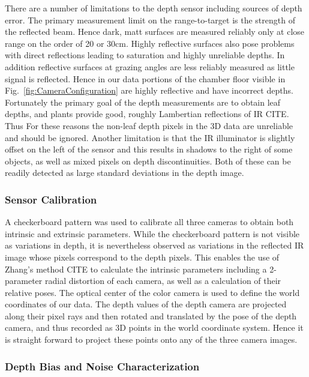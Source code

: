 There are a number of limitations to the depth sensor including sources of depth error.  The primary measurement limit on the range-to-target is the strength of the reflected beam. Hence dark, matt surfaces are measured reliably only at close range on the order of 20 or 30cm.  Highly reflective surfaces also pose problems with direct reflections leading to saturation and highly unreliable depths.  In addition reflective surfaces at grazing angles are less reliably measured as little signal is reflected.  Hence in our data portions of the chamber floor visible in Fig.~\ref{fig:CameraConfiguration} are highly reflective and have incorrect depths.  Fortunately the primary goal of the depth measurements are to obtain leaf depths, and plants provide good, roughly Lambertian reflections of IR CITE{}.  Thus For these reasons the non-leaf depth pixels in the 3D data are unreliable and should be ignored.  Another limitation is that the IR illuminator is slightly offset on the left of the sensor and this results in shadows to the right of some objects, as well as mixed pixels on depth discontinuities.  Both of these can be readily detected as large standard deviations in the depth image.

\subsubsection{Sensor Calibration}

A checkerboard pattern was used to calibrate all three cameras to obtain both intrinsic and extrinsic parameters.  While the checkerboard pattern is not visible as variations in depth, it is nevertheless observed as variations in the reflected IR image whose pixels correspond to the depth pixels.  This enables the use of Zhang's method CITE{} to calculate the intrinsic parameters including a 2-parameter radial distortion of each camera, as well as a calculation of their relative poses.  The optical center of the color camera is used to define the world coordinates of our data.  The depth values of the depth camera are projected along their pixel rays and then rotated and translated by the pose of the depth camera, and thus recorded as 3D points in the world coordinate system.  Hence it is straight forward to project these points onto any of the three camera images.

\subsubsection{Depth Bias and Noise Characterization}
\label{sec:bias}

